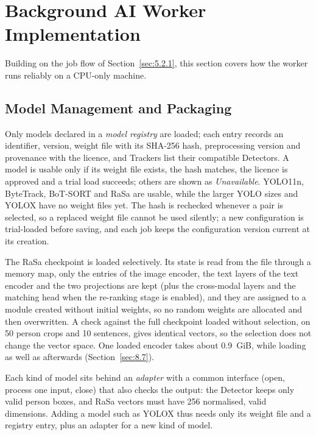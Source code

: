 \section{Background AI Worker Implementation}
\label{sec:6.2}

Building on the job flow of Section~\ref{sec:5.2.1}, this section covers how the worker runs reliably on a CPU-only machine.

\subsection{Model Management and Packaging}
\label{sec:6.2.1}

Only models declared in a \emph{model registry} are loaded; each entry records an identifier, version, weight file with its SHA-256 hash, preprocessing version and provenance with the licence, and Trackers list their compatible Detectors. A model is usable only if its weight file exists, the hash matches, the licence is approved and a trial load succeeds; others are shown as \emph{Unavailable}. YOLO11n, ByteTrack, BoT-SORT and RaSa are usable, while the larger YOLO sizes and YOLOX have no weight files yet. The hash is rechecked whenever a pair is selected, so a replaced weight file cannot be used silently; a new configuration is trial-loaded before saving, and each job keeps the configuration version current at its creation.

The RaSa checkpoint is loaded selectively. Its state is read from the file through a memory map, only the entries of the image encoder, the text layers of the text encoder and the two projections are kept (plus the cross-modal layers and the matching head when the re-ranking stage is enabled), and they are assigned to a module created without initial weights, so no random weights are allocated and then overwritten. A check against the full checkpoint loaded without selection, on 50 person crops and 10 sentences, gives identical vectors, so the selection does not change the vector space. One loaded encoder takes about 0.9~GiB, while loading as well as afterwards (Section~\ref{sec:8.7}).

Each kind of model sits behind an \emph{adapter} with a common interface (open, process one input, close) that also checks the output: the Detector keeps only valid person boxes, and RaSa vectors must have 256 normalised, valid dimensions. Adding a model such as YOLOX thus needs only its weight file and a registry entry, plus an adapter for a new kind of model.

